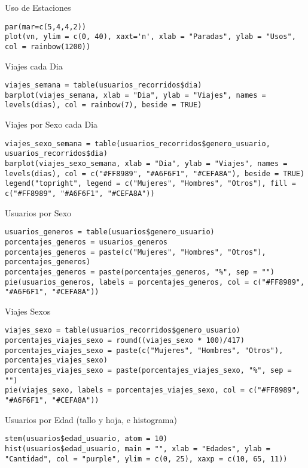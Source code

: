 \documentclass[
]{article}
\begin{document}
Uso de Estaciones

\begin{verbatim}
par(mar=c(5,4,4,2))
plot(vn, ylim = c(0, 40), xaxt='n', xlab = "Paradas", ylab = "Usos", col = rainbow(1200))
\end{verbatim}

Viajes cada Dia

\begin{verbatim}
viajes_semana = table(usuarios_recorridos$dia)
barplot(viajes_semana, xlab = "Dia", ylab = "Viajes", names = levels(dias), col = rainbow(7), beside = TRUE)
\end{verbatim}

Viajes por Sexo cada Dia

\begin{verbatim}
viajes_sexo_semana = table(usuarios_recorridos$genero_usuario, usuarios_recorridos$dia)
barplot(viajes_sexo_semana, xlab = "Dia", ylab = "Viajes", names = levels(dias), col = c("#FF8989", "#A6F6F1", "#CEFA8A"), beside = TRUE)
legend("topright", legend = c("Mujeres", "Hombres", "Otros"), fill = c("#FF8989", "#A6F6F1", "#CEFA8A"))
\end{verbatim}

Usuarios por Sexo

\begin{verbatim}
usuarios_generos = table(usuarios$genero_usuario)
porcentajes_generos = usuarios_generos
porcentajes_generos = paste(c("Mujeres", "Hombres", "Otros"), porcentajes_generos)
porcentajes_generos = paste(porcentajes_generos, "%", sep = "")
pie(usuarios_generos, labels = porcentajes_generos, col = c("#FF8989", "#A6F6F1", "#CEFA8A"))
\end{verbatim}

Viajes Sexos

\begin{verbatim}
viajes_sexo = table(usuarios_recorridos$genero_usuario)
porcentajes_viajes_sexo = round((viajes_sexo * 100)/417)
porcentajes_viajes_sexo = paste(c("Mujeres", "Hombres", "Otros"), porcentajes_viajes_sexo)
porcentajes_viajes_sexo = paste(porcentajes_viajes_sexo, "%", sep = "")
pie(viajes_sexo, labels = porcentajes_viajes_sexo, col = c("#FF8989", "#A6F6F1", "#CEFA8A"))
\end{verbatim}

Usuarios por Edad (tallo y hoja, e histograma)

\begin{verbatim}
stem(usuarios$edad_usuario, atom = 10)
hist(usuarios$edad_usuario, main = "", xlab = "Edades", ylab = "Cantidad", col = "purple", ylim = c(0, 25), xaxp = c(10, 65, 11))
\end{verbatim}
\end{document}
